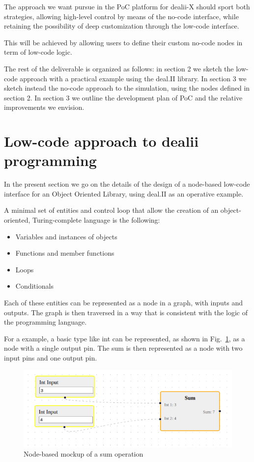 \documentclass[a4paper,12pt]{article}
\begin{document}
The approach we want pursue in the PoC platform for dealii-X should sport both strategies, allowing high-level control by means of the no-code interface, while retaining the possibility of deep customization through the low-code interface. 

This will be achieved by allowing users to define their custom no-code nodes in term of low-code logic.

The rest of the deliverable is organized as follows: in section 2 we sketch the low-code approach with a practical example using the deal.II library. In section 3 we sketch instead the no-code approach to the simulation, using the nodes defined in section 2. In section 3 we outline the development plan of PoC and the relative improvements we envision. 


\section{\textcolor{EUblue}{Low-code approach to dealii programming}}

In the present section we go on the details of the design of a node-based low-code interface for an Object Oriented Library, using deal.II as an operative example.

A minimal set of entities and control loop that allow the creation of an object-oriented, Turing-complete language is the following:
\begin{itemize}
\item Variables and instances of objects
\item Functions and member functions
\item Loops
\item Conditionals
\end{itemize}

Each of these entities can be represented as a node in a graph, with inputs and outputs. The graph is then traversed in a way that is consistent with the logic of the programming language.

For a example, a basic type like int can be represented, as shown in Fig.~\ref{sum}, as a node with a single output pin. The sum is then represented as a node with two input pins and one output pin. 

\begin{figure}
    \includegraphics[width=400pt]{sum.png}
    \caption{Node-based mockup of a sum operation}
    \label{sum}
\end{figure}
\end{document}
